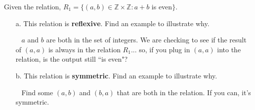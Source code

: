 \documentclass[a4paper,12pt]{book}
\newcounter{question}
\begin{document}
    \begin{questionNOGRADE}{\thequestion}

        Given the relation, $R_{1} = \{ (a,b) \in \mathbb{Z} \times \mathbb{Z} : a + b$ is even$\}$.

        \begin{itemize}
            \item[a.]   This relation is \textbf{reflexive}. Find an example to illustrate why.
                \begin{hint}{\ }
                    $a$ and $b$ are both in the set of integers. We are checking to see if the
                    result of $(a,a)$ is always in the relation $R_{1}$... so,
                    if you plug in $(a,a)$ into the relation, is the output still ``is even"?
                \end{hint}


            \item[b.]   This relation is \textbf{symmetric}. Find an example to illustrate why.
                \begin{hint}{\ }
                    Find some $(a,b)$ and $(b,a)$ that are both in the relation.
                    If you can, it's symmetric.
                \end{hint}

        \end{itemize}

    \end{questionNOGRADE}

\newpage
\end{document}
